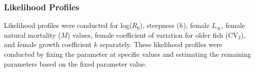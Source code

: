 \documentclass[11pt,
  english,
  a4paper,
]{article}
\begin{document}
\leavevmode\tagmcend\tagstructend\par


\hypertarget{likelihood-profiles}{%
\subsubsection{Likelihood Profiles}\label{likelihood-profiles}}

\leavevmode\tagmcend\tagstructend


Likelihood profiles were conducted for log({\(R_0\)\leavevmode\tagmcend\tagstructend}), steepness ({\(h\)\leavevmode\tagmcend\tagstructend}), female {\(L_{\infty}\)\leavevmode\tagmcend\tagstructend}, female natural mortality ({\(M\)\leavevmode\tagmcend\tagstructend}) values, female coefficient of variation for older fish ({\(\text{CV}_2\)\leavevmode\tagmcend\tagstructend}), and female growth coefficient {\(k\)\leavevmode\tagmcend\tagstructend} separately. These likelihood profiles were conducted by fixing the parameter at specific values and estimating the remaining parameters based on the fixed parameter value.

\leavevmode\tagmcend\tagstructend\par

\end{document}
